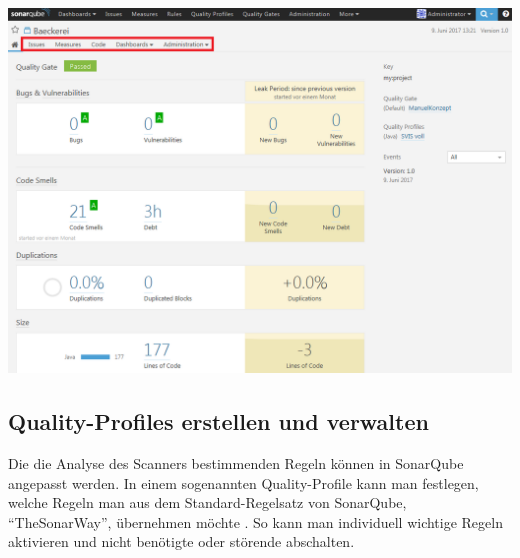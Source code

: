 \begin{minipage}{\linewidth}
	\centering
	\includegraphics[scale=0.5]{img/StartSeiteSonarNachProjekt.PNG}
	\vspace{2em}
\end{minipage}



\subsection{Quality-Profiles erstellen und verwalten}

Die die Analyse des Scanners bestimmenden Regeln können in SonarQube angepasst werden. In einem sogenannten Quality-Profile kann man festlegen, welche Regeln man aus dem Standard-Regelsatz von SonarQube, \enquote{TheSonarWay}, übernehmen möchte \autocite[Vgl.][]{QualityProfile}. So kann man individuell wichtige Regeln aktivieren und nicht benötigte oder störende abschalten.


